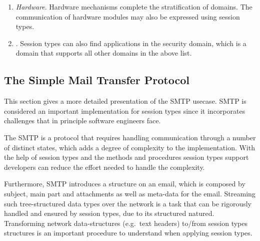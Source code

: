 \begin{enumerate}


	\item	{\em Hardware}.
	Hardware mechanisms complete the stratification of domains.
	The communication of hardware modules may also be expressed
	using session types.


	\item	{}.
	Session types can also find applications in the security domain,
	which is a domain that supports all other domains in the above list.

\end{enumerate}



\subsection{The Simple Mail Transfer Protocol}

This section gives a more detailed presentation of the SMTP
usecase. SMTP is considered an important implementation for
session types since it incorporates challenges that in principle
software engineers face.

The SMTP is a protocol that requires handling
communication through a number of distinct states,
which adds a degree of complexity to the implementation.
With the help of session types and the methods and procedures
session types support developers can reduce the effort
needed to handle the complexity.

Furthermore, SMTP introduces a structure on an email,
which is composed by subject, main part and attachments
as well as meta-data for the email. Streaming such 
tree-structured data types over the network is a task that
can be rigorously handled and ensured by session types,
due to its structured natured. Transforming
network data-structures (e.g.~text headers)
to/from session types structures is an important
procedure to understand when applying session types. 


